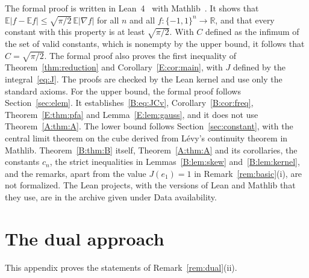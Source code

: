 \documentclass[11pt]{amsart}
\theoremstyle{remark}
\numberwithin{equation}{section}
\newcommand{\R}{\mathbb{R}}
\newcommand{\E}{\mathbb{E}}
\begin{document}
The formal proof is written in Lean~4~\cite{MU21} with Mathlib~\cite{Mathlib20}. It shows that $\E|f-\E f|\le\sqrt{\pi/2}\,\E|\nabla f|$ for all $n$ and all $f\colon\{-1,1\}^n\to\R$, and that every constant with this property is at least $\sqrt{\pi/2}$. With $C$ defined as the infimum of the set of valid constants, which is nonempty by the upper bound, it follows that $C=\sqrt{\pi/2}$. The formal proof also proves the first inequality of Theorem~\ref{thm:reduction} and Corollary~\ref{E:cor:main}, with $J$ defined by the integral~\eqref{eq:J}. The proofs are checked by the Lean kernel and use only the standard axioms. For the upper bound, the formal proof follows Section~\ref{sec:elem}. It establishes~\eqref{B:eq:JCv}, Corollary~\ref{B:cor:freq}, Theorem~\ref{E:thm:pfa} and Lemma~\ref{E:lem:gauss}, and it does not use Theorem~\ref{A:thm:A}. The lower bound follows Section~\ref{sec:constant}, with the central limit theorem on the cube derived from L\'evy's continuity theorem in Mathlib. Theorem~\ref{B:thm:B} itself, Theorem~\ref{A:thm:A} and its corollaries, the constants $c_n$, the strict inequalities in Lemmas~\ref{B:lem:skew} and~\ref{B:lem:kernel}, and the remarks, apart from the value $J(e_1)=1$ in Remark~\ref{rem:basic}(i), are not formalized. The Lean projects, with the versions of Lean and Mathlib that they use, are in the archive given under Data availability.

\appendix
\section{The dual approach}\label{app:dual}

This appendix proves the statements of Remark~\ref{rem:dual}(ii).
\end{document}
